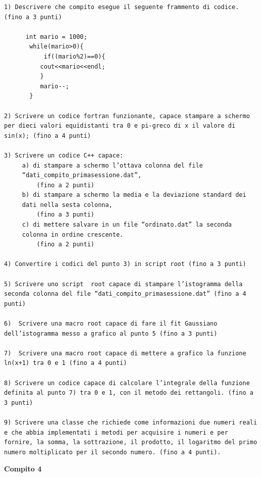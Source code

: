 \documentclass[11pt,fleqn]{book} %
\begin{document}
\begin{verbatim}
1) Descrivere che compito esegue il seguente frammento di codice. (fino a 3 punti)

      int mario = 1000;
       while(mario>0){
           if((mario%2)==0){
          cout<<mario<<endl;
          }
          mario--;
       }

2) Scrivere un codice fortran funzionante, capace stampare a schermo 
per dieci valori equidistanti tra 0 e pi-greco di x il valore di 
sin(x); (fino a 4 punti)

3) Scrivere un codice C++ capace:
     a) di stampare a schermo l’ottava colonna del file 
     “dati_compito_primasessione.dat”, 
         (fino a 2 punti)
     b) di stampare a schermo la media e la deviazione standard dei 
     dati nella sesta colonna,
         (fino a 3 punti)
     c) di mettere salvare in un file “ordinato.dat” la seconda 
     colonna in ordine crescente.
         (fino a 2 punti)

4) Convertire i codici del punto 3) in script root (fino a 3 punti)

5) Scrivere uno script  root capace di stampare l’istogramma della 
seconda colonna del file “dati_compito_primasessione.dat” (fino a 4 
punti)

6)  Scrivere una macro root capace di fare il fit Gaussiano 
dell’istogramma messo a grafico al punto 5 (fino a 3 punti)

7)  Scrivere una macro root capace di mettere a grafico la funzione 
ln(x+1) tra 0 e 1 (fino a 4 punti)

8) Scrivere un codice capace di calcolare l’integrale della funzione 
definita al punto 7) tra 0 e 1, con il metodo dei rettangoli. (fino a 
3 punti)

9) Scrivere una classe che richiede come informazioni due numeri reali 
e che abbia implementati i metodi per acquisire i numeri e per 
fornire, la somma, la sottrazione, il prodotto, il logaritmo del primo 
numero moltiplicato per il secondo numero. (fino a 4 punti).
\end{verbatim}

\textbf{Compito 4}
\end{document}
